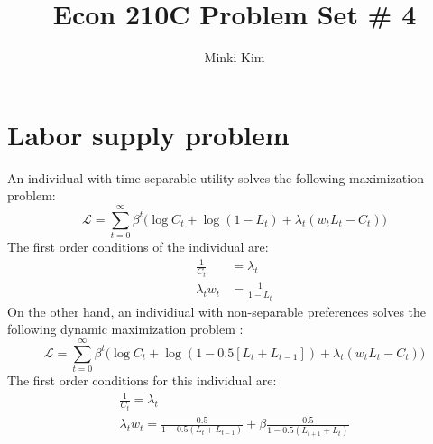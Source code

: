 \documentclass[11pt]{amsart}
\title{Econ 210C Problem Set \# 4}
\author{Minki Kim}
\begin{document}
\maketitle

\section{Labor supply problem}
An individual with time-separable utility solves the following maximization problem: 
\begin{equation*}
\mathcal{L} = \sum_{t=0}^{\infty} \beta^t \bigg( \log C_t + \log (1-L_t)  + \lambda_t  \left(  w_t L_t - C_t \right) \bigg)
\end{equation*}
The first order conditions of the individual are: 
\begin{align*}
\frac{1}{C_t} &= \lambda_t  \\
\lambda_t w_t &= \frac{1}{1-L_t} 
\end{align*}
On the other hand, an individiual with non-separable preferences solves the following dynamic maximization problem :
\begin{equation*}
\mathcal{L} = \sum_{t=0}^{\infty} \beta^t \bigg( \log C_t + \log\left( 1 - 0.5 \left[ L_t + L_{t-1} \right] \right) + \lambda_t  \left(  w_t L_t - C_t \right)  \bigg)
\end{equation*}
The first order conditions for this individual are: 
\begin{gather*}
\frac{1}{C_t} = \lambda_t  \\
\lambda_t w_t = \frac{0.5}{1 - 0.5 \left( L_t + L_{t-1} \right)} + \beta \frac{0.5}{1 - 0.5 \left( L_{t+1} + L_t \right)}
\end{gather*}
\end{document}
